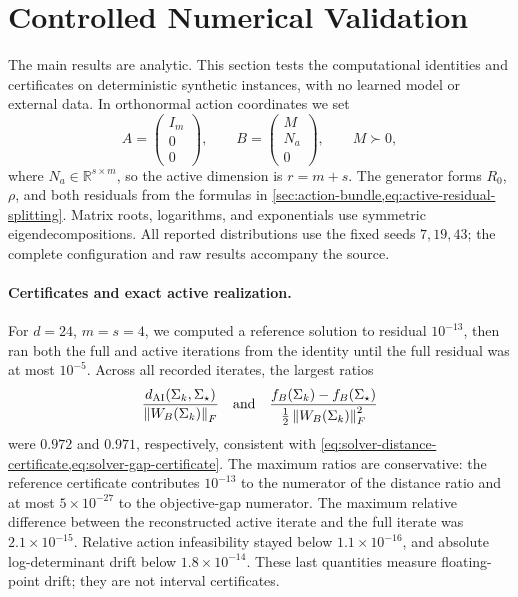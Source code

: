 \section{Controlled Numerical Validation}
\label{sec:numerical-validation}

The main results are analytic.  This section tests the computational identities
and certificates on deterministic synthetic instances, with no learned model
or external data.  In orthonormal action coordinates we set
\[
  A=\begin{pmatrix}I_m\\0\\0\end{pmatrix},\qquad
  B=\begin{pmatrix}M\\N_a\\0\end{pmatrix},\qquad M\succ0,
\]
where \(N_a\in\mathbb R^{s\times m}\), so the active dimension is
\(r=m+s\).  The generator forms \(R_0\), \(\rho\), and both residuals from
the formulas in \cref{sec:action-bundle,eq:active-residual-splitting}.  Matrix
roots, logarithms, and exponentials use symmetric eigendecompositions.  All
reported distributions use the fixed seeds \(7,19,43\); the complete
configuration and raw results accompany the source.

\paragraph{Certificates and exact active realization.}
For \(d=24\), \(m=s=4\), we computed a reference solution to residual
\(10^{-13}\), then ran both the full and active iterations from the identity
until the full residual was at most \(10^{-5}\).  Across all recorded iterates,
the largest ratios
\[
  \frac{d_{\mathrm{AI}}(\Sigma_k,\Sigma_\star)}{\left\lVert W_B(\Sigma_k)\right\rVert_F}
  \quad\text{and}\quad
  \frac{f_B(\Sigma_k)-f_B(\Sigma_\star)}
       {\tfrac12\left\lVert W_B(\Sigma_k)\right\rVert_F^2}
\]
were \(0.972\) and \(0.971\), respectively, consistent with
\cref{eq:solver-distance-certificate,eq:solver-gap-certificate}.  The maximum
ratios are conservative: the reference certificate contributes \(10^{-13}\)
to the numerator of the distance ratio and at most \(5\times10^{-27}\) to the
objective-gap numerator.  The maximum
relative difference between the reconstructed active iterate and the full
iterate was \(2.1\times10^{-15}\).  Relative action infeasibility stayed below
\(1.1\times10^{-16}\), and absolute log-determinant drift below
\(1.8\times10^{-14}\).  These last quantities measure floating-point drift;
they are not interval certificates.

